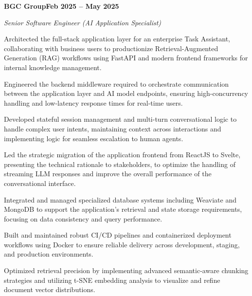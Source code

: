 \documentclass[letterpaper,10pt]{article}
\newcommand{\headingBf}[2]{\par\noindent\hspace*{10pt}\textbf{#1}\hfill\textbf{#2}}
\newcommand{\headingIt}[2]{\par\noindent\hspace*{10pt}\textit{#1}\hfill\textit{#2}}
\newenvironment{resume_list}{\vspace{-7pt}\begin{itemize}[itemsep=-2px, parsep=1pt, leftmargin=30pt]}{\end{itemize}}
\begin{document}
  \headingBf{BGC Group}{Feb 2025 -- May 2025}
  \headingIt{Senior Software Engineer (AI Application Specialist)}{}
  \begin{resume_list}
    \item Architected the full-stack application layer for an enterprise Task Assistant, collaborating with business users to productionize Retrieval-Augmented Generation (RAG) workflows using FastAPI and modern frontend frameworks for internal knowledge management.
    \item Engineered the backend middleware required to orchestrate communication between the application layer and AI model endpoints, ensuring high-concurrency handling and low-latency response times for real-time users.
    \item Developed stateful session management and multi-turn conversational logic to handle complex user intents, maintaining context across interactions and implementing logic for seamless escalation to human agents.
    \item Led the strategic migration of the application frontend from ReactJS to Svelte, presenting the technical rationale to stakeholders, to optimize the handling of streaming LLM responses and improve the overall performance of the conversational interface.
    \item Integrated and managed specialized database systems including Weaviate and MongoDB to support the application’s retrieval and state storage requirements, focusing on data consistency and query performance.
    \item Built and maintained robust CI/CD pipelines and containerized deployment workflows using Docker to ensure reliable delivery across development, staging, and production environments.
    \item Optimized retrieval precision by implementing advanced semantic-aware chunking strategies and utilizing t-SNE embedding analysis to visualize and refine document vector distributions.
  \end{resume_list}
\end{document}
